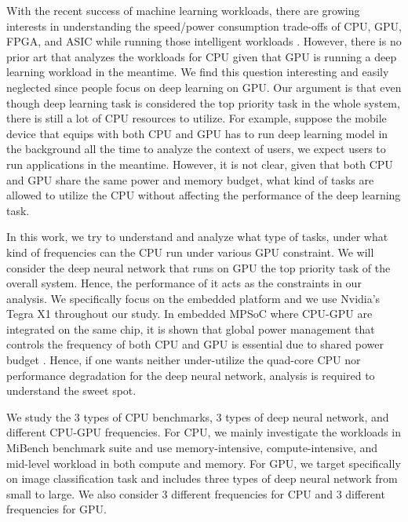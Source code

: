 With the recent success of machine learning workloads, there are growing interests in understanding the speed/power consumption trade-offs of CPU, GPU, FPGA, and ASIC while running those intelligent workloads \cite{malik2016architecture, nurvitadhi2016accelerating}. However, there is no prior art that analyzes the workloads for CPU given that GPU is running a deep learning workload in the meantime. We find this question interesting and easily neglected since people focus on deep learning on GPU. Our argument is that even though deep learning task is considered the top priority task in the whole system, there is still a lot of CPU resources to utilize. For example, suppose the mobile device that equips with both CPU and GPU has to run deep learning model in the background all the time to analyze the context of users, we expect users to run applications in the meantime. However, it is not clear, given that both CPU and GPU share the same power and memory budget, what kind of tasks are allowed to utilize the CPU without affecting the performance of the deep learning task.

In this work, we try to understand and analyze what type of tasks, under what kind of frequencies can the CPU run under various GPU constraint. We will consider the deep neural network that runs on GPU the top priority task of the overall system. Hence, the performance of it acts as the constraints in our analysis. We specifically focus on the embedded platform and we use Nvidia's Tegra X1 throughout our study. In embedded MPSoC where CPU-GPU are integrated on the same chip, it is shown that global power management that controls the frequency of both CPU and GPU is essential due to shared power budget \cite{pathania2014integrated}. Hence, if one wants neither under-utilize the quad-core CPU nor performance degradation for the deep neural network, analysis is required to understand the sweet spot.

We study the 3 types of CPU benchmarks, 3 types of deep neural network, and different CPU-GPU frequencies. For CPU, we mainly investigate the workloads in MiBench benchmark suite \cite{mibench} and use memory-intensive, compute-intensive, and mid-level workload in both compute and memory. For GPU, we target specifically on image classification task and includes three types of deep neural network from small to large. We also consider 3 different frequencies for CPU and 3 different frequencies for GPU.
